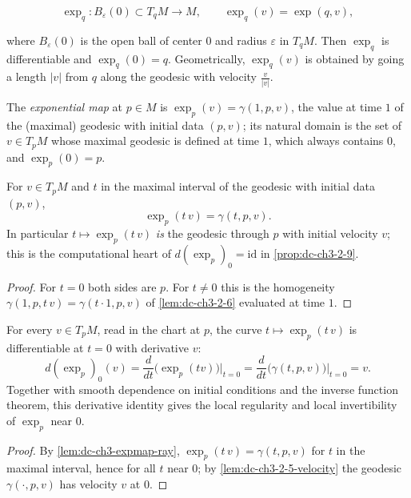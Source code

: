 $$
\exp_q:B_\varepsilon(0)\subset T_qM\to M,\qquad\exp_q(v)=\exp(q,v),
$$

where $B_\varepsilon(0)$ is the open ball of center $0$ and radius $\varepsilon$
in $T_qM$. Then $\exp_q$ is differentiable and $\exp_q(0)=q$. Geometrically,
$\exp_q(v)$ is obtained by going a length $|v|$ from $q$ along the geodesic with
velocity $\frac{v}{|v|}$.

\begin{definition}
  \label{def:dc-ch3-expmap}
  \leanok
  The \emph{exponential map} at $p\in M$ is $\exp_p(v)=\gamma(1,p,v)$, the value at
  time $1$ of the (maximal) geodesic with initial data $(p,v)$; its natural
  domain is the set of $v\in T_pM$ whose maximal geodesic is defined at time
  $1$, which always contains $0$, and $\exp_p(0)=p$.

\end{definition}

\begin{lemma}
  \label{lem:dc-ch3-expmap-ray}
  \leanok
  For $v\in T_pM$ and $t$ in the maximal interval of the geodesic with initial
  data $(p,v)$,
  $$\exp_p(t\,v)=\gamma(t,p,v).$$
  In particular $t\mapsto\exp_p(t\,v)$ \emph{is} the geodesic through $p$ with
  initial velocity $v$; this is the computational heart of
  $d(\exp_p)_0=\mathrm{id}$ in \cref{prop:dc-ch3-2-9}.
\end{lemma}
\begin{proof}
  \sketch
  \leanok
  For $t=0$ both sides are $p$. For $t\neq0$ this is the homogeneity
  $\gamma(1,p,t\,v)=\gamma(t\cdot 1,p,v)$ of \cref{lem:dc-ch3-2-6} evaluated at
  time $1$.
\end{proof}

\begin{lemma}[$d(\exp_p)_0=\mathrm{id}$ along rays]
  \label{lem:dc-ch3-2-9-dexp}
  \leanok
  For every $v\in T_pM$, read in the chart at $p$, the curve
  $t\mapsto\exp_p(t\,v)$ is differentiable at $t=0$ with derivative $v$:
  $$
  d(\exp_p)_0(v)=\frac{d}{dt}\big(\exp_p(tv)\big)\Big|_{t=0}
    =\frac{d}{dt}\big(\gamma(t,p,v)\big)\Big|_{t=0}=v.
  $$
  Together with smooth dependence on initial conditions and the inverse function
  theorem, this derivative identity gives the local regularity and local
  invertibility of $\exp_p$ near $0$.
\end{lemma}
\begin{proof}
  \sketch
  \leanok
  By \cref{lem:dc-ch3-expmap-ray}, $\exp_p(t\,v)=\gamma(t,p,v)$ for $t$ in the
  maximal interval, hence for all $t$ near $0$; by
  \cref{lem:dc-ch3-2-5-velocity} the geodesic $\gamma(\cdot,p,v)$ has velocity
  $v$ at $0$.
\end{proof}

